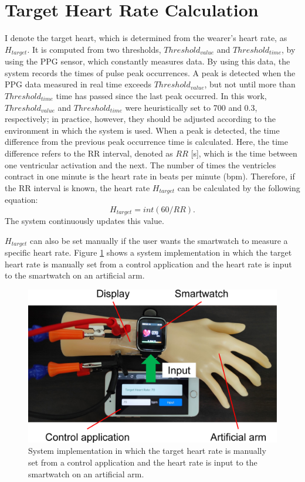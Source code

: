\section{Target Heart Rate Calculation}
I denote the target heart, which is determined from the wearer's heart rate, as $H_{target}$. It is computed from two thresholds, $Threshold_{value}$ and $Threshold_{time}$, by using the PPG sensor, which constantly measures data. By using this data, the system records the times of pulse peak occurrences. A peak is detected when the PPG data measured in real time exceeds $Threshold_{value}$, but not until more than $Threshold_{time}$ time has passed since the last peak occurred. In this work, $Threshold_{value}$ and $Threshold_{time}$ were heuristically set to 700 and 0.3, respectively; in practice, however, they should be adjusted according to the environment in which the system is used. When a peak is detected, the time difference from the previous peak occurrence time is calculated. Here, the time difference refers to the RR interval, denoted as $RR$ [s], which is the time between one ventricular activation and the next. The number of times the ventricles contract in one minute is the heart rate in beats per minute (bpm). Therefore, if the RR interval is known, the heart rate $H_{target}$ can be calculated by the following equation:
\begin{equation}
  \label{eqn:target}
  H_{target} = int(60 / RR).
\end{equation}
The system continuously updates this value.\par

$H_{target}$ can also be set manually if the user wants the smartwatch to measure a specific heart rate. Figure \ref{fig:system} shows a system implementation in which the target heart rate is manually set from a control application and the heart rate is input to the smartwatch on an artificial arm.

\begin{figure}[!t]
  \centering
  \includegraphics[width=1\linewidth]{figures/system.eps}
  \caption{System implementation in which the target heart rate is manually set from a control application and the heart rate is input to the smartwatch on an artificial arm.}
  \label{fig:system}
\end{figure}


